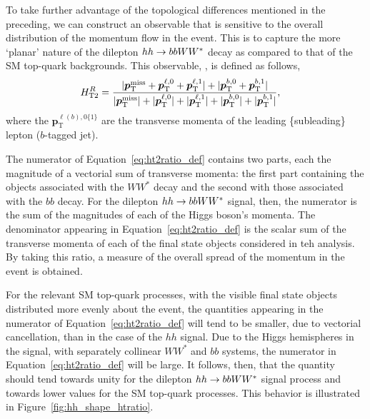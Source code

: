 %
%

To take further advantage of the topological differences mentioned in the preceding, we can construct
an observable that is sensitive to the overall distribution of the momentum flow in the event.
This is to capture the more `planar' nature of the dilepton $hh \rightarrow bbWW^*$ decay as compared
to that of the SM top-quark backgrounds.
This observable, \htratio, is defined as follows,
\begin{align}
    H_{\text{T2}}^{R} &= \frac{|\bm{p}_{\text{T}}^{\text{miss}} + \bm{p}_{\text{T}}^{\ell,0} + \bm{p}_{\text{T}}^{\ell,1}| + | \bm{p}_{\text{T}}^{b,0} + \bm{p}_{\text{T}}^{b,1}|}{|\bm{p}_{\text{T}}^{\text{miss}}| + |\bm{p}_{\text{T}}^{\ell,0}| + |\bm{p}_{\text{T}}^{\ell,1}| + |\bm{p}_{\text{T}}^{b,0}| + |\bm{p}_{\text{T}}^{b,1}|},
    \label{eq:ht2ratio_def}
\end{align}
where the $\bm{p}_{\text{T}}^{\ell(b),0 \{1\}}$ are the transverse momenta of the leading \{subleading\} lepton ($b$-tagged jet).

The numerator of Equation~\ref{eq:ht2ratio_def} contains two parts, each the magnitude of a vectorial sum of transverse
momenta: the first part containing the objects associated with the $WW^*$ decay and the second with those associated
with the $bb$ decay.
For the dilepton $hh \rightarrow bbWW^*$ signal, then, the numerator is the sum of the magnitudes of each of the Higgs boson's
momenta.
The denominator appearing in Equation~\ref{eq:ht2ratio_def} is the scalar sum of the transverse momenta of each of the
final state objects considered in teh analysis.
By taking this ratio, a measure of the overall spread of the momentum in the event is obtained.

For the relevant SM top-quark processes, with the visible final state objects distributed more evenly
about the event, the quantities appearing in the numerator of Equation~\ref{eq:ht2ratio_def} will
tend to be smaller, due to vectorial cancellation, than in the case of the $hh$ signal.
Due to the Higgs hemispheres in the signal, with separately collinear $WW^*$ and $bb$ systems,
the numerator in Equation~\ref{eq:ht2ratio_def} will be large.
It follows, then, that the quantity \htratio should tend towards unity for the dilepton $hh \rightarrow bbWW^*$
signal process and towards lower values for the SM top-quark processes.
This behavior is illustrated in Figure~\ref{fig:hh_shape_htratio}.

